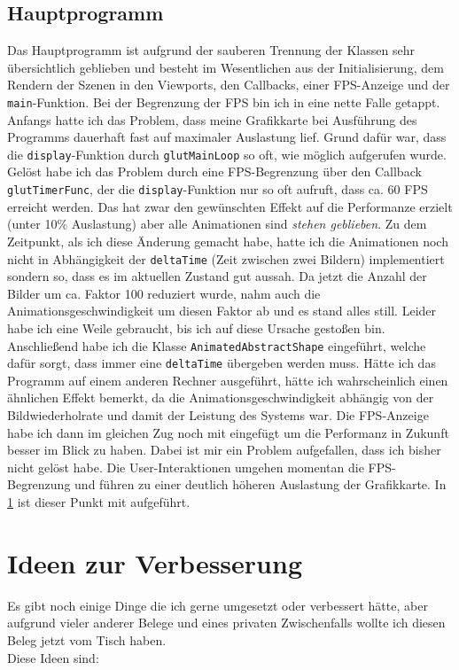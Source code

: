 \documentclass{article}
\let\oldsection\section
\renewcommand\section{\needspace{15\baselineskip}\oldsection}
\let\oldsubsection\subsection
\renewcommand\subsection{\needspace{10\baselineskip}\oldsubsection}
\begin{document}
\subsection{Hauptprogramm}
Das Hauptprogramm ist aufgrund der sauberen Trennung der Klassen sehr übersichtlich geblieben und besteht im Wesentlichen aus der Initialisierung, dem Rendern der Szenen in den Viewports, den Callbacks, einer FPS-Anzeige und der \texttt{main}-Funktion.
Bei der Begrenzung der FPS bin ich in eine nette Falle getappt.
Anfangs hatte ich das Problem, dass meine Grafikkarte bei Ausführung des Programms dauerhaft fast auf maximaler Auslastung lief.
Grund dafür war, dass die \texttt{display}-Funktion durch \texttt{glutMainLoop} so oft, wie möglich aufgerufen wurde.
Gelöst habe ich das Problem durch eine FPS-Begrenzung über den Callback \texttt{glutTimerFunc}, der die \texttt{display}-Funktion nur so oft aufruft, dass ca. 60 FPS erreicht werden.
Das hat zwar den gewünschten Effekt auf die Performanze erzielt (unter 10\% Auslastung) aber alle Animationen sind \textit{stehen geblieben}.
Zu dem Zeitpunkt, als ich diese Änderung gemacht habe, hatte ich die Animationen noch nicht in Abhängigkeit der \texttt{deltaTime} (Zeit zwischen zwei Bildern) implementiert sondern so, dass es im aktuellen Zustand gut aussah.
Da jetzt die Anzahl der Bilder um ca. Faktor 100 reduziert wurde, nahm auch die Animationsgeschwindigkeit um diesen Faktor ab und es stand alles still.
Leider habe ich eine Weile gebraucht, bis ich auf diese Ursache gestoßen bin.
Anschließend habe ich die Klasse \texttt{AnimatedAbstractShape} eingeführt, welche dafür sorgt, dass immer eine \texttt{deltaTime} übergeben werden muss.
Hätte ich das Programm auf einem anderen Rechner ausgeführt, hätte ich wahrscheinlich einen ähnlichen Effekt bemerkt, da die Animationsgeschwindigkeit abhängig von der Bildwiederholrate und damit der Leistung des Systems war.
Die FPS-Anzeige habe ich dann im gleichen Zug noch mit eingefügt um die Performanz in Zukunft besser im Blick zu haben.
Dabei ist mir ein Problem aufgefallen, dass ich bisher nicht gelöst habe. Die User-Interaktionen umgehen momentan die FPS-Begrenzung und führen zu einer deutlich höheren Auslastung der Grafikkarte.
In \ref{sec:improvements} ist dieser Punkt mit aufgeführt.

\clearpage

\section{Ideen zur Verbesserung} \label{sec:improvements}
Es gibt noch einige Dinge die ich gerne umgesetzt oder verbessert hätte, aber aufgrund vieler anderer Belege und eines privaten Zwischenfalls wollte ich diesen Beleg jetzt vom Tisch haben.\\
Diese Ideen sind:
\end{document}
